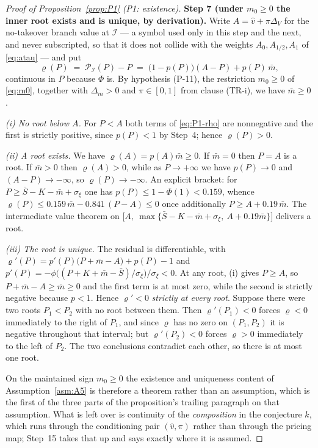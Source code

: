 \begin{proof}[Proof of Proposition~\ref{prop:P1} (P1: existence)]
\smallskip
\noindent\textbf{Step 7 (under $m_0 \ge 0$ the inner root exists and is unique, by derivation).}
Write $A = \hat v + \pi\Delta_V$ for the no-takeover branch value at $\mathcal I$ --- a symbol used
only in this step and the next, and never subscripted, so that it does not collide with the weights
$A_0,A_{1/2},A_1$ of \eqref{eq:atau} --- and put
\begin{equation}
\label{eq:P1-rho}
\varrho(P) \;=\; \mathcal P_{\mathcal I}(P) - P \;=\; \bigl(1-p(P)\bigr)(A-P) + p(P)\,\bar m,
\end{equation}
continuous in $P$ because $\Phi$ is. By hypothesis (P-11), the restriction $m_0 \ge 0$ of
\eqref{eq:m0}, together with $\Delta_m > 0$ and $\pi \in [0,1]$ from clause (TR-i), we have
$\bar m \ge 0$.

\emph{(i) No root below $A$.} For $P < A$ both terms of \eqref{eq:P1-rho} are nonnegative and the
first is strictly positive, since $p(P) < 1$ by Step~4; hence $\varrho(P) > 0$.

\emph{(ii) A root exists.} We have $\varrho(A) = p(A)\bar m \ge 0$. If $\bar m = 0$ then $P = A$ is a
root. If $\bar m > 0$ then $\varrho(A) > 0$, while as $P \to +\infty$ we have $p(P) \to 0$ and
$(A-P) \to -\infty$, so $\varrho(P) \to -\infty$. An explicit bracket: for
$P \ge \bar S-K-\bar m+\sigma_\xi$ one has $p(P) \le 1-\Phi(1) < 0.159$, whence
$\varrho(P) \le 0.159\,\bar m - 0.841\,(P-A) \le 0$ once additionally $P \ge A+0.19\,\bar m$. The
intermediate value theorem on $\bigl[A,\ \max\{\bar S-K-\bar m+\sigma_\xi,\ A+0.19\bar m\}\bigr]$
delivers a root.

\emph{(iii) The root is unique.} The residual is differentiable, with
$\varrho'(P) = p'(P)\bigl(P+\bar m-A\bigr) + p(P) - 1$ and
$p'(P) = -\phi\bigl((P+K+\bar m-\bar S)/\sigma_\xi\bigr)/\sigma_\xi < 0$. At any root, (i) gives
$P \ge A$, so $P+\bar m-A \ge \bar m \ge 0$ and the first term is at most zero, while the second is
strictly negative because $p < 1$. Hence $\varrho' < 0$ \emph{strictly at every root}. Suppose there
were two roots $P_1 < P_2$ with no root between them. Then $\varrho'(P_1) < 0$ forces $\varrho < 0$
immediately to the right of $P_1$, and since $\varrho$ has no zero on $(P_1,P_2)$ it is negative
throughout that interval; but $\varrho'(P_2) < 0$ forces $\varrho > 0$ immediately to the left of
$P_2$. The two conclusions contradict each other, so there is at most one root.

On the maintained sign $m_0 \ge 0$ the existence and uniqueness content of Assumption~\ref{asm:A5} is
therefore a theorem rather than an assumption, which is the first of the three parts of the
proposition's trailing paragraph on that assumption. What is left over is continuity of the
\emph{composition} in the conjecture $k$, which runs through the conditioning pair $(\hat v,\pi)$
rather than through the pricing map; Step~15 takes that up and says exactly where it is assumed.


\end{proof}
